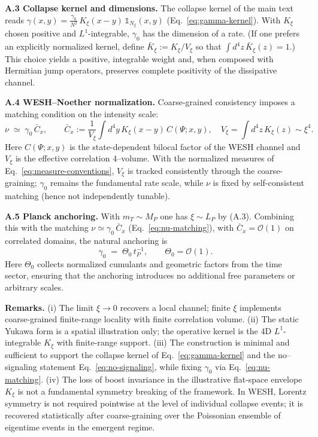 \documentclass[12pt,a4paper]{article}
\numberwithin{equation}{section}
\begin{document}
\vspace{0.3cm}
\noindent\textbf{A.3 Collapse kernel and dimensions.}
The collapse kernel of the main text reads \(\gamma(x,y)=\frac{\gamma_0}{N^2}\,K_\xi(x-y)\,\mathbb{1}_{N_\xi}(x,y)\) (Eq.~\eqref{eq:gamma-kernel}). With $K_\xi$ chosen positive and $L^1$-integrable, $\gamma_0$ has the dimension of a rate.
(If one prefers an explicitly normalized kernel, define $\bar K_\xi:=K_\xi/V_\xi$ so that
$\int d^4z\,\bar K_\xi(z)=1$.) This choice yields a positive, integrable weight and, when composed with Hermitian jump operators, preserves complete positivity of the dissipative channel.

\vspace{0.3cm}
\noindent\textbf{A.4 WESH–Noether normalization.}
Coarse-grained consistency imposes a matching condition on the intensity scale:
\begin{equation}
\nu \;\simeq\; \gamma_0\,\bar C_x,\qquad 
\bar C_x:=\frac{1}{V_\xi}\!\int d^4y\,K_\xi(x-y)\,C(\Psi;x,y),\quad 
V_\xi=\!\int d^4z\,K_\xi(z)\sim \xi^4.
\label{eq:nu-matching} \tag{A.5}
\end{equation}
Here \(C(\Psi;x,y)\) is the state-dependent bilocal factor of the WESH channel and \(V_\xi\) is the effective correlation 4–volume. With the normalized measures of Eq.~\eqref{eq:measure-conventions}, $V_\xi$ is tracked consistently through the coarse-graining; $\gamma_0$ remains the fundamental rate scale, while $\nu$ is fixed by self-consistent matching (hence not independently tunable).

\vspace{0.3cm}
\noindent\textbf{A.5 Planck anchoring.}
With $m_T\sim M_P$ one has $\xi\sim L_P$ by (A.3). Combining this with the matching $\nu\simeq\gamma_0\,\bar C_x$ (Eq.~\eqref{eq:nu-matching}), with $\bar C_x=\mathcal O(1)$ on correlated domains, the natural anchoring is
\begin{equation}
\gamma_0 \;=\; \Theta_0\,t_P^{-1},\qquad \Theta_0=\mathcal O(1).
\tag{A.6}
\end{equation}
Here $\Theta_0$ collects normalized cumulants and geometric factors from the time sector,
ensuring that the anchoring introduces no additional free parameters or arbitrary scales.

\vspace{0.6cm}
\noindent\textbf{Remarks.}
(i) The limit \(\xi\to 0\) recovers a local channel; finite \(\xi\) implements coarse-grained finite-range locality with finite correlation volume.  
(ii) The static Yukawa form is a spatial illustration only; the operative kernel is the 4D $L^1$-integrable \(K_\xi\) with finite-range support.  
(iii) The construction is minimal and sufficient to support the collapse kernel of Eq.~\eqref{eq:gamma-kernel} and the no–signaling statement Eq.~\eqref{eq:no-signaling}, while fixing \(\gamma_0\) via Eq.~\eqref{eq:nu-matching}.   
(iv) The loss of boost invariance in the illustrative flat-space envelope \(K_\xi\) is not a fundamental symmetry breaking of the framework. In WESH, Lorentz symmetry is not required pointwise at the level of individual collapse events; it is recovered statistically after coarse-graining over the Poissonian ensemble of eigentime events in the emergent regime.
\endgroup
\end{document}

